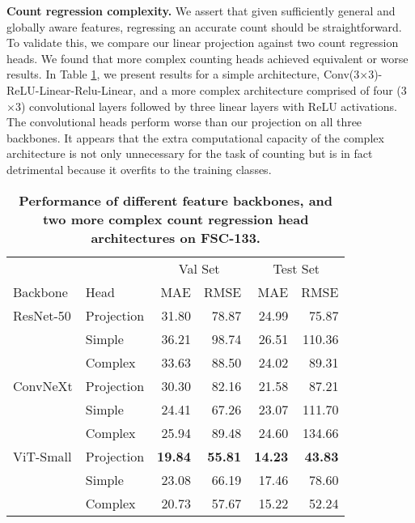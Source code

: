 \documentclass[letterpaper, 11pt]{IEEEtran}
\begin{document}
\vspace{5mm}

\textbf{Count regression complexity.}
We assert that given sufficiently general and globally aware features, regressing an accurate count should be straightforward. To validate this, we compare our linear projection against two count regression heads. We found that more complex counting heads achieved equivalent or worse results. In Table \ref{ablation_arch}, we present results for a simple architecture, Conv(3$\times$3)-ReLU-Linear-Relu-Linear, and a more complex architecture comprised of four (3$\times$3) convolutional layers followed by three linear layers with ReLU activations. The convolutional heads perform worse than our projection on all three backbones. It appears that the extra computational capacity of the complex architecture is not only unnecessary for the task of counting but is in fact detrimental because it overfits to the training classes.
\begin{table}
    \centering
    \fontsize{9}{9}\selectfont
    \begin{tabular}{llrrrr}
\toprule
 & & \multicolumn{2}{c}{Val Set} & \multicolumn{2}{c}{Test Set} \\
 Backbone & Head & MAE & RMSE & MAE & RMSE \\
 \midrule

ResNet-50 & Projection & 31.80 & 78.87 & 24.99 & 75.87 \\
& Simple & 36.21 & 98.74 & 26.51 & 110.36\\
& Complex & 33.63 & 88.50 & 24.02 & 89.31
\\


ConvNeXt & Projection & 30.30 & 82.16 & 21.58 & 87.21 \\
 & Simple & 24.41 & 67.26 & 23.07 & 111.70 \\
 & Complex &  25.94 & 89.48 & 24.60 & 134.66 \\
ViT-Small & Projection & \textbf{19.84}  & \textbf{55.81} & \textbf{14.23}  & \textbf{43.83} \\

 & Simple & 23.08 & 66.19 & 17.46 & 78.60 \\
 &  Complex & 20.73 & 57.67 & 15.22 & 52.24 \\
\bottomrule
\end{tabular}
     \caption{\textbf{Performance of different feature backbones, and two more complex count regression head architectures on FSC-133.}
    }
    \label{ablation_arch}
\end{table}
\end{document}
